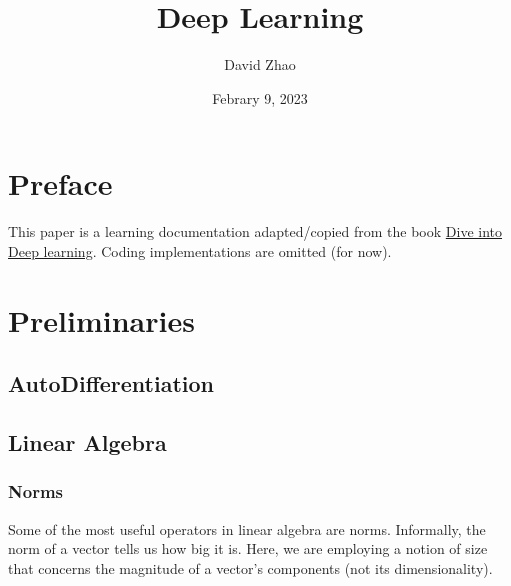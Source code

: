 \documentclass[a4paper,12pt]{article}
\theoremstyle{definition}
\begin{document}
\title{Deep Learning}
\author{David Zhao}
\date{Febrary 9, 2023}
\maketitle

\section{Preface}
This paper is a learning documentation adapted/copied from the book \href{https://d2l.ai/}{Dive into Deep learning}.
Coding implementations are omitted (for now).

\section{Preliminaries}
\subsection*{AutoDifferentiation}

\subsection*{Linear Algebra}
\subsubsection*{Norms}
Some of the most useful operators in linear algebra are norms. Informally, the norm of a vector tells us how big it is.
Here, we are employing a notion of size that concerns the magnitude of a vector’s components (not its dimensionality).
\end{document}
